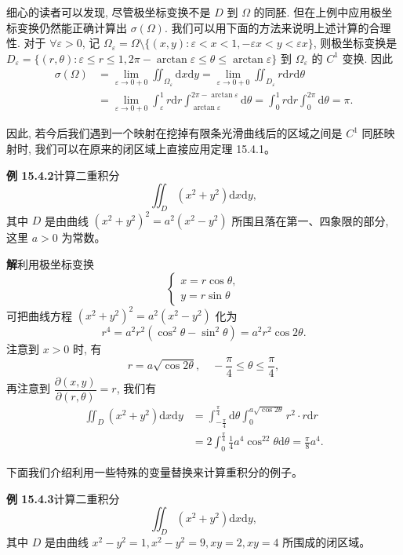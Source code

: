 \documentclass[UTF8, 12pt, fontset=fandol, oneside]{ctexart}
\begin{document}
细心的读者可以发现, 尽管极坐标变换不是 $D$ 到 $\Omega$ 的同胚. 但在上例中应用极坐标变换仍然能正确计算出 $\sigma(\Omega)$. 我们可以用下面的方法来说明上述计算的合理性. 对于 $\forall\varepsilon>0$, 记 $\Omega_\varepsilon=\Omega\setminus\{(x,y):\varepsilon<x<1,-\varepsilon x<y<\varepsilon x\}$, 则极坐标变换是 $D_\varepsilon=\{(r,\theta):\varepsilon\leqslant r\leqslant1,2\pi-\arctan\varepsilon\leqslant\theta\leqslant\arctan\varepsilon\}$ 到 $\Omega_\varepsilon$ 的 $C^1$ 变换. 因此
\[
\begin{aligned}
  \sigma(\Omega)
  &=\lim_{\varepsilon\to0+0}\iint_{\Omega_\varepsilon}\mathrm dx\mathrm dy
  =\lim_{\varepsilon\to0+0}\iint_{D_\varepsilon}r\mathrm dr\mathrm d\theta\\
  &=\lim_{\varepsilon\to0+0}\int_\varepsilon^1 r\mathrm dr
  \int_{\arctan\varepsilon}^{2\pi-\arctan\varepsilon}\mathrm d\theta
  =\int_0^1 r\mathrm dr\int_0^{2\pi}\mathrm d\theta=\pi.
\end{aligned}
\]

因此, 若今后我们遇到一个映射在挖掉有限条光滑曲线后的区域之间是 $C^1$ 同胚映射时, 我们可以在原来的闭区域上直接应用定理 15.4.1。

\noindent\textbf{例 15.4.2}\quad 计算二重积分
\[
  \iint_D(x^2+y^2)\mathrm dx\mathrm dy,
\]
其中 $D$ 是由曲线 $(x^2+y^2)^2=a^2(x^2-y^2)$ 所围且落在第一、四象限的部分, 这里 $a>0$ 为常数。

\noindent\textbf{解}\quad 利用极坐标变换
\[
  \begin{cases}
    x=r\cos\theta,\\
    y=r\sin\theta
  \end{cases}
\]
可把曲线方程 $(x^2+y^2)^2=a^2(x^2-y^2)$ 化为
\[
  r^4=a^2r^2(\cos^2\theta-\sin^2\theta)=a^2r^2\cos2\theta.
\]
注意到 $x>0$ 时, 有
\[
  r=a\sqrt{\cos2\theta},\quad -\frac\pi4\leqslant\theta\leqslant\frac\pi4,
\]
再注意到 $\dfrac{\partial(x,y)}{\partial(r,\theta)}=r$, 我们有
\[
\begin{aligned}
  \iint_D(x^2+y^2)\mathrm dx\mathrm dy
  &=\int_{-\frac\pi4}^{\frac\pi4}\mathrm d\theta
  \int_0^{a\sqrt{\cos2\theta}}r^2\cdot r\mathrm dr\\
  &=2\int_0^{\frac\pi4}\frac14a^4\cos^22\theta\mathrm d\theta
  =\frac\pi8a^4.
\end{aligned}
\]

下面我们介绍利用一些特殊的变量替换来计算重积分的例子。

\noindent\textbf{例 15.4.3}\quad 计算二重积分
\[
  \iint_D(x^2+y^2)\mathrm dx\mathrm dy,
\]
其中 $D$ 是由曲线 $x^2-y^2=1,x^2-y^2=9,xy=2,xy=4$ 所围成的闭区域。
\end{document}

